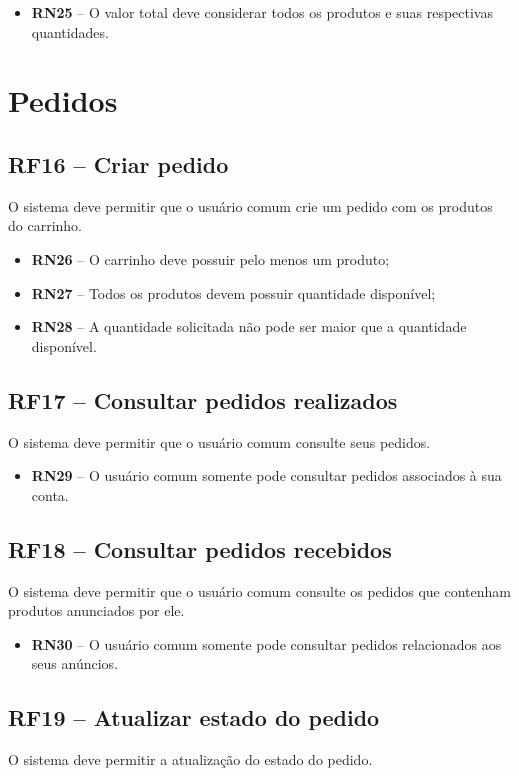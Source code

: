 \documentclass{scrreprt}
\begin{document}
\begin{itemize}
	\item \textbf{RN25} -- O valor total deve considerar todos os produtos e suas respectivas quantidades.
\end{itemize}

\section{Pedidos}

\subsection{RF16 -- Criar pedido}
O sistema deve permitir que o usuário comum crie um pedido com os produtos do carrinho.
\begin{itemize}
	\item \textbf{RN26} -- O carrinho deve possuir pelo menos um produto;
	\item \textbf{RN27} -- Todos os produtos devem possuir quantidade disponível;
	\item \textbf{RN28} -- A quantidade solicitada não pode ser maior que a quantidade disponível.
\end{itemize}

\subsection{RF17 -- Consultar pedidos realizados}
O sistema deve permitir que o usuário comum consulte seus pedidos.
\begin{itemize}
	\item \textbf{RN29} -- O usuário comum somente pode consultar pedidos associados à sua conta.
\end{itemize}

\subsection{RF18 -- Consultar pedidos recebidos}
O sistema deve permitir que o usuário comum consulte os pedidos que contenham produtos anunciados por ele.
\begin{itemize}
	\item \textbf{RN30} -- O usuário comum somente pode consultar pedidos relacionados aos seus anúncios.
\end{itemize}

\subsection{RF19 -- Atualizar estado do pedido}
O sistema deve permitir a atualização do estado do pedido.
\end{document}
